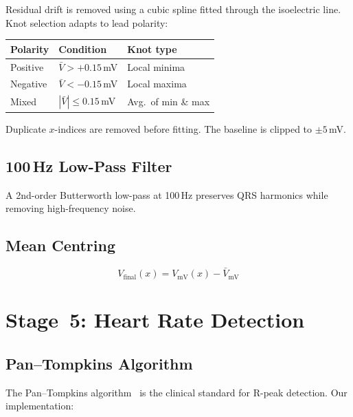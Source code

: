\documentclass[conference]{IEEEtran}
\begin{document}
Residual drift is removed using a cubic spline fitted through the
isoelectric line. Knot selection adapts to lead polarity:

\begin{table}[!h]
\centering
\footnotesize
\begin{tabular}{lll}
  \toprule
  \textbf{Polarity} & \textbf{Condition} & \textbf{Knot type} \\
  \midrule
  Positive & $\bar{V} > +0.15$\,mV & Local minima \\
  Negative & $\bar{V} < -0.15$\,mV & Local maxima \\
  Mixed    & $|\bar{V}| \leq 0.15$\,mV & Avg.\ of min \& max \\
  \bottomrule
\end{tabular}
\end{table}

Duplicate $x$-indices are removed before fitting. The baseline is clipped to
$\pm 5$\,mV.

\subsection{100\,Hz Low-Pass Filter}

A 2nd-order Butterworth low-pass at 100\,Hz preserves QRS harmonics while
removing high-frequency noise.

\subsection{Mean Centring}

\begin{equation}
  V_{\text{final}}(x) = V_{\text{mV}}(x) - \bar{V}_{\text{mV}}
\end{equation}

\section{Stage~5: Heart Rate Detection}

\subsection{Pan--Tompkins Algorithm}

The Pan--Tompkins algorithm~\cite{pan1985} is the clinical standard for
R-peak detection. Our implementation:
\end{document}
